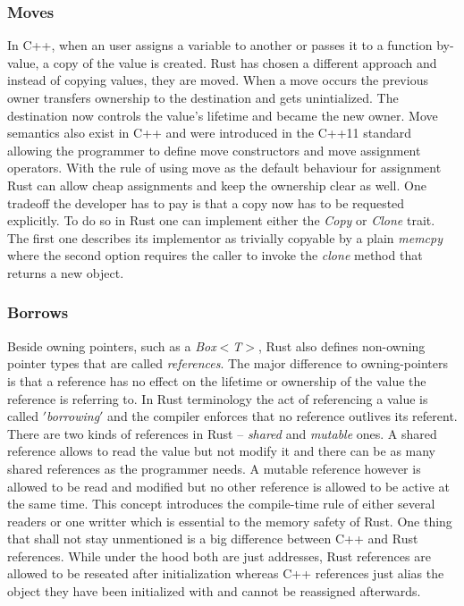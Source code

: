 \documentclass[lnbip]{svmultln}
\begin{document}
\subsubsection{Moves}
%
In C++, when an user assigns a variable to another or passes it to a function by-value, a copy of the value is created. Rust has chosen a different approach and instead of copying values, they are moved. When a move occurs the previous owner transfers ownership to the destination and gets unintialized. The destination now controls the value's lifetime and became the new owner. Move semantics also exist in C++ and were introduced in the C++11 standard allowing the programmer to define move constructors and move assignment operators. \cite{CppMove} With the rule of using move as the default behaviour for assignment Rust can allow cheap assignments and keep the ownership clear as well. One tradeoff the developer has to pay is that a copy now has to be requested explicitly. To do so in Rust one can implement either the \textit{Copy} or \textit{Clone} trait. The first one describes its implementor as trivially copyable by a plain \textit{memcpy} where the second option requires the caller to invoke the \textit{clone} method that returns a new object. \cite[Chapter 4. Ownership]{ProgrammingRust}
%

\subsubsection{Borrows}
%
Beside owning pointers, such as a \textit{Box$<$T$>$}, Rust also defines non-owning pointer types that are called \textit{references}. The major difference to owning-pointers is that a reference has no effect on the lifetime or ownership of the value the reference is referring to. In Rust terminology the act of referencing a value is called \textit{$'$borrowing$'$} and the compiler enforces that no reference outlives its referent. There are two kinds of references in Rust -- \textit{shared} and \textit{mutable} ones. A shared reference allows to read the value but not modify it and there can be as many shared references as the programmer needs. A mutable reference however is allowed to be read and modified but no other reference is allowed to be active at the same time. This concept introduces the compile-time rule of either several readers or one writter which is essential to the memory safety of Rust. One thing that shall not stay unmentioned is a big difference between C++ and Rust references. While under the hood both are just addresses, Rust references are allowed to be reseated after initialization whereas C++ references just alias the object they have been initialized with and cannot be reassigned afterwards. \cite[Chapter 5. References]{ProgrammingRust}
%
\end{document}
